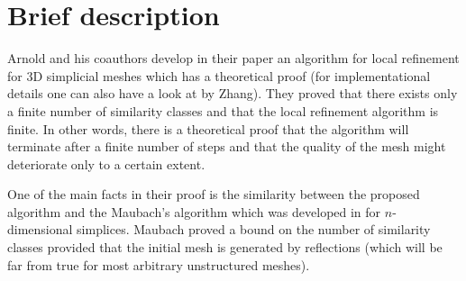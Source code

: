 \documentclass[a4paper,12pt]{amsart}
\numberwithin{equation}{section}
\begin{document}
%	
%	
%	
%	


\section{Brief description}

Arnold and his coauthors develop in their paper \cite{arnold} an algorithm for local refinement for 3D simplicial meshes which has a theoretical proof (for implementational details one can also have a look at \cite{zhang} by Zhang). They proved that there exists only a finite number of similarity classes and that the local refinement algorithm is finite. In other words, there is a theoretical proof that the algorithm will terminate after a finite number of steps and that the quality of the mesh might deteriorate only to a certain extent.

One of the main facts in their proof is the similarity between the proposed algorithm and the Maubach's algorithm which was developed in \cite{maubach} for $n$-dimensional simplices. Maubach proved a bound on the number of similarity classes provided that the initial mesh is generated by reflections (which will be far from true for most arbitrary unstructured meshes).
\end{document}
